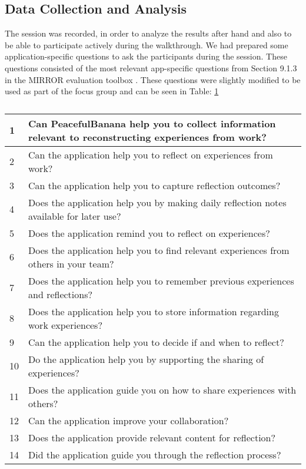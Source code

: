 \subsection{Data Collection and Analysis}
The session was recorded, in order to analyze the results after hand and also to be able to participate actively during the walkthrough. We had prepared some application-specific questions to ask the participants during the session. These questions consisted of the most relevant app-specific questions from Section 9.1.3 in the MIRROR evaluation toolbox \citep{mirrorevaluation}. These questions were slightly modified to be used as part of the focus group and can be seen in Table: \ref{questiontable}
\begin{table}[H]
    \begin{tabularx}{\textwidth}{|l|X|}
    \hline
    1  & Can PeacefulBanana help you to collect information relevant to reconstructing experiences from work? \\ \hline
    2  & Can the application help you to reflect on experiences from work?                                    \\ \hline
    3  & Can the application help you to capture reflection outcomes?                                         \\ \hline
    4  & Does the application help you by making daily reflection notes available for later use?              \\ \hline
    5  & Does the application remind you to reflect on experiences?                                           \\ \hline
    6  & Does the application help you to find relevant experiences from others in your team?                 \\ \hline
    7  & Does the application help you to remember previous experiences and reflections?                      \\ \hline
    8  & Does the application help you to store information regarding work experiences?                       \\ \hline
    9  & Can the application help you to decide if and when to reflect?                                       \\ \hline
    10 & Do the application help you by supporting the sharing of experiences?                                \\ \hline
    11 & Does the application guide you on how to share experiences with others?                              \\ \hline
    12 & Can the application improve your collaboration?                                                      \\ \hline
    13 & Does the application provide relevant content for reflection?                                        \\ \hline
    14 & Did the application guide you through the reflection process?                                        \\ \hline
    \end{tabularx}
    \caption{}
    \label{questiontable}
\end{table}

